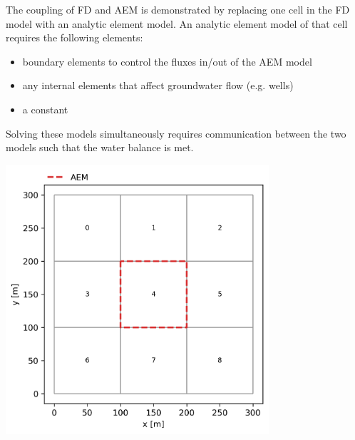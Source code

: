 \documentclass[17pt, a0paper, portrait, margin=0mm, innermargin=5mm, blockverticalspace=7mm, colspace=6.5mm, subcolspace=6.5mm]{tikzposter}
\begin{document}
\begin{columns}
{\begin{multicols}{3}
        The coupling of FD and AEM is demonstrated by replacing one cell in the FD model with an analytic element model. An analytic element model of that cell requires the following elements:

        \vspace{3mm}
        
        \begin{itemize}[noitemsep]
            \item boundary elements to control the fluxes in/out of the AEM model
            \item any internal elements that affect groundwater flow (e.g. wells)
            \item a constant
        \end{itemize}

        \vspace{3mm}
        
        Solving these models simultaneously requires communication between the two models such that the water balance is met.

        \begin{tikzfigure}
            \includegraphics[height=100mm]{figures/test_model.png}
        \end{tikzfigure}
        

\end{multicols}}
\end{columns}
\end{document}
